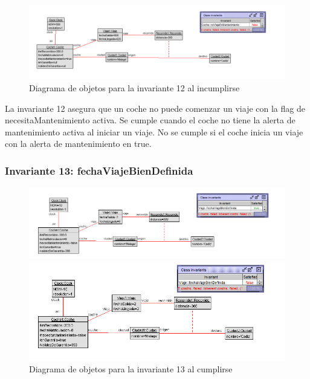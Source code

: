 \documentclass[12pt.a4paper]{article}
\begin{document}
\begin{figure}[H]
     \includegraphics[width=1\linewidth]{Soils/12_v2.png}
     \caption{Diagrama de objetos para la invariante 12 al incumplirse}
\end{figure}

La invariante 12 asegura que un coche no puede comenzar un viaje con la flag de necesitaMantenimiento activa. Se cumple cuando el coche no tiene la alerta de mantenimiento activa al iniciar un viaje. No se cumple si el coche inicia un viaje con la alerta de mantenimiento en true.

\subsubsection{Invariante 13: fechaViajeBienDefinida}
\begin{figure}[H]
        \begin{minipage}{0.49\textwidth}
            \centering
            \includegraphics[width=1\linewidth]{Soils/13.png}
        \end{minipage}
        \hfill
        \begin{minipage}{0.49\textwidth}
        \centering
        \includegraphics[width=1\linewidth]{Soils/13_v2.png}
    \end{minipage}
            \caption{Diagrama de objetos para la invariante 13 al cumplirse}
\end{figure}
\end{document}
